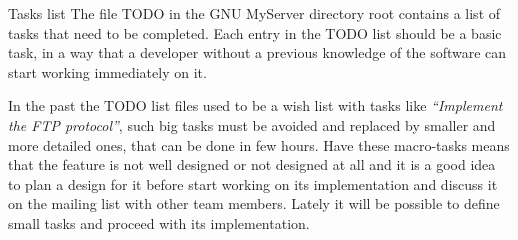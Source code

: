 \documentclass[12pt]{article}
\begin{document}
\begin{section}{Tasks list}
The file TODO in the GNU MyServer directory root contains a list of
tasks that need to be completed.
Each entry in the TODO list should be a basic task, in a way that a
developer without a previous knowledge of the software can start
working immediately on it.

In the past the TODO list files used to be a wish list with tasks like
\textit{``Implement the FTP protocol''}, such big tasks must be
avoided and replaced by smaller and more detailed ones, that can be
done in few hours.
Have these macro-tasks means that the feature is not well designed or
not designed at all and it is a good idea to plan a design for it
before start working on its implementation and discuss it on the
mailing list with other team members.
Lately it will be possible to define small tasks and proceed with its
implementation.
\end{section}
\end{document}
